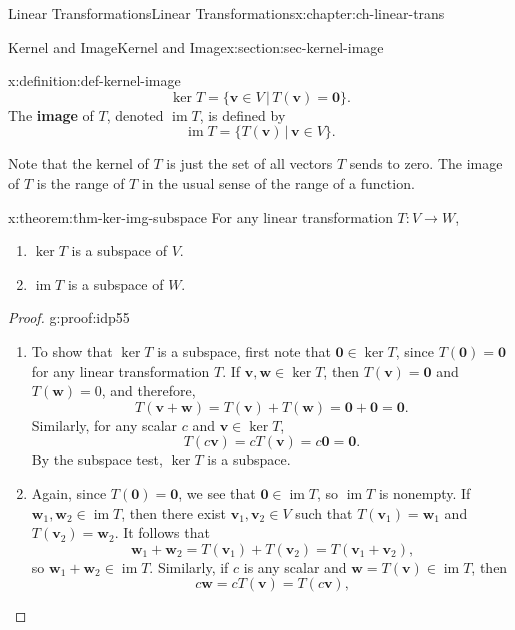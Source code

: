 \documentclass[oneside,10pt,]{book}
\newcommand{\terminology}[1]{\textbf{#1}}
\numberwithin{equation}{section}
\newcommand{\im}{\operatorname{im}}
\newcommand{\vv}{\mathbf{v}}
\newcommand{\ww}{\mathbf{w}}
\begin{document}
\begin{chapterptx}{Linear Transformations}{}{Linear Transformations}{}{}{x:chapter:ch-linear-trans}
\begin{sectionptx}{Kernel and Image}{}{Kernel and Image}{}{}{x:section:sec-kernel-image}
\begin{definition}{}{x:definition:def-kernel-image}
\begin{equation*}
\ker T = \{\vv\in V \,|\, T(\vv)=\mathbf{0}\}\text{.}
\end{equation*}
The \terminology{image} of \(T\), denoted \(\im T\), is defined by%
\begin{equation*}
\im T = \{T(\vv) \,|\, \vv\in V\}\text{.}
\end{equation*}
%
\end{definition}
Note that the kernel of \(T\) is just the set of all vectors \(T\) sends to zero. The image of \(T\) is the range of \(T\) in the usual sense of the range of a function.%
\begin{theorem}{}{}{x:theorem:thm-ker-img-subspace}%
For any linear transformation \(T:V\to W\),%
\begin{enumerate}
\item{}\(\ker T\) is a subspace of \(V\).%
\item{}\(\im T\) is a subspace of \(W\).%
\end{enumerate}
%
\end{theorem}
\begin{proof}{}{g:proof:idp55}
%
\begin{enumerate}
\item{}To show that \(\ker T\) is a subspace, first note that \(\mathbf{0}\in \ker T\), since \(T(\mathbf{0})=\mathbf{0}\) for any linear transformation \(T\). If \(\vv,\ww\in \ker T\), then \(T(\vv)=\mathbf{0}\) and \(T(\ww)=0\), and therefore,%
\begin{equation*}
T(\vv+\ww)=T(\vv)+T(\ww)=\mathbf{0}+\mathbf{0}=\mathbf{0}\text{.}
\end{equation*}
Similarly, for any scalar \(c\) and \(\vv\in \ker T\),%
\begin{equation*}
T(c\vv)=cT(\vv)=c\mathbf{0}=\mathbf{0}\text{.}
\end{equation*}
By the subspace test, \(\ker T\) is a subspace.%
\item{}Again, since \(T(\mathbf{0})=\mathbf{0}\), we see that \(\mathbf{0}\in \im T\), so \(\im T\) is nonempty. If \(\ww_1,\ww_2\in \im T\), then there exist \(\vv_1,\vv_2\in V\) such that \(T(\vv_1)=\ww_1\) and \(T(\vv_2)=\ww_2\). It follows that%
\begin{equation*}
\ww_1+\ww_2 = T(\vv_1)+T(\vv_2) = T(\vv_1+\vv_2)\text{,}
\end{equation*}
so \(\ww_1+\ww_2\in \im T\). Similarly, if \(c\) is any scalar and \(\ww=T(\vv)\in\im T\), then%
\begin{equation*}
c\ww=cT(\vv)=T(c\vv)\text{,}
\end{equation*}

\end{enumerate}
\end{proof}
\end{sectionptx}
\end{chapterptx}
\end{document}
